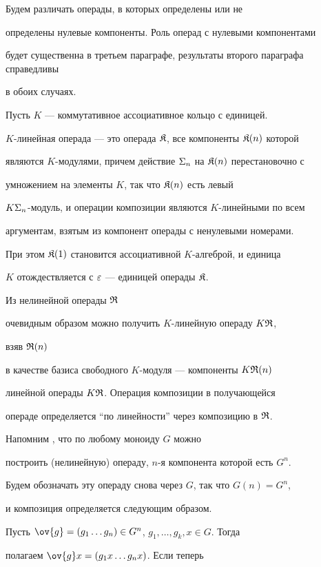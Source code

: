 




Будем различать операды, в которых определены или не


определены нулевые компоненты. Роль операд с нулевыми компонентами


будет существенна в третьем параграфе, результаты второго параграфа справедливы


в обоих случаях.








Пусть $K$ --- коммутативное ассоциативное кольцо с единицей.


$K$-линейная операда --- это операда ${\frak K}$, все компоненты ${\frak K}(n)$ которой


являются $K$-модулями, причем действие $\Sigma_n$ на ${\frak K}(n)$ перестановочно с


умножением на элементы $K$, так что ${\frak K}(n)$ есть левый


$K\Sigma_n$-модуль, и операции композиции являются $K$-линейными по всем


аргументам, взятым из компонент операды с ненулевыми номерами.


При этом ${\frak K}(1)$ становится ассоциативной $K$-алгеброй, и единица


$K$ отождествляется с $\varepsilon$ --- единицей операды ${\frak K}$.


Из нелинейной операды ${\frak R}$


очевидным образом можно получить $K$-линейную операду $K{\frak R}$,


взяв ${\frak R}(n)$


в качестве базиса свободного $K$-модуля --- компоненты $K{\frak R}(n)$


линейной операды $K{\frak R}$. Операция композиции в получающейся


операде определяется ``по линейности'' через композицию в ${\frak R}$.





Напомним \cite{TK}, что по любому моноиду $G$ можно


построить (нелинейную) операду, $n$-я компонента которой есть $G^n$.


Будем обозначать эту операду снова через $G$, так что $G(n)=G^n$,


и композиция определяется следующим образом.


Пусть $\ov{g}=(g_1\dotsc g_n)\in G^n$, $g_1,\dotsc ,g_k,x\in G$. Тогда


полагаем $ \ov{g}x= (g_1 x\dotsc g_n x)$. Если теперь


